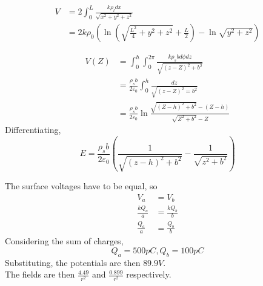 \documentclass[answers]{exam}
\begin{document}
\begin{questions}
\begin{solution}
	\begin{align*}
		V &= 2\int_0^L \frac{k\rho_l dx}{\sqrt{x^2+y^2+z^2}} \\
		  &= 2k\rho_0\left(\ln\left(\sqrt{\frac{L^2}{4} + y^2 + z^2} + \frac{L}{2}\right) - \ln\sqrt{y^2 + z^2}\right)
	\end{align*}
\end{solution}


\begin{solution}
	\begin{align*}
		V(Z) &= \int_0^h \int_0^{2\pi} \frac{k\rho_s bd\phi dz}{\sqrt{(z-Z)^2 + b^2}} \\
		     &= \frac{\rho_s b}{2\varepsilon_0} \int_0^h \frac{dz}{\sqrt{(z-Z)^2 = b^2}} \\
		     &= \frac{\rho_sb}{2\varepsilon_0}\ln\frac{\sqrt{(Z-h)^2 + b^2} - (Z-h)}{\sqrt{Z^2 + b^2} - Z}
	\end{align*}
	Differentiating,
	$$E = \frac{\rho_sb}{2\varepsilon_0}\left(\frac{1}{\sqrt{(z-h)^2+b^2}} - \frac{1}{\sqrt{z^2+b^2}}\right)$$
\end{solution}


\begin{solution}
	The surface voltages have to be equal, so
	\begin{align*}
		V_a &= V_b \\
		\frac{kQ_a}{a} &= \frac{kQ_b}{b} \\
		\frac{Q_a}{a} &= \frac{Q_b}{b}
	\end{align*}
	Considering the sum of charges,
	$$Q_a = 500\unit{pC}, Q_b = 100\unit{pC}$$
	Substituting, the potentials are then $89.9\unit{V}$. \\
	The fields are then $\frac{4.49}{r^2}$ and $\frac{0.899}{r^2}$ respectively.
\end{solution}
\end{questions}
\end{document}
